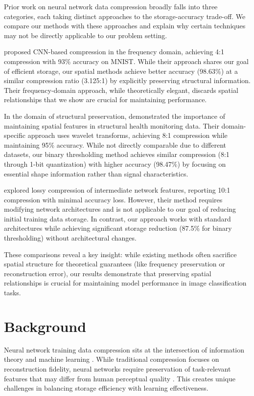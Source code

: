 \documentclass{article} %
\begin{document}
Prior work on neural network data compression broadly falls into three categories, each taking distinct approaches to the storage-accuracy trade-off. We compare our methods with these approaches and explain why certain techniques may not be directly applicable to our problem setting.

\citet{wang2022learning} proposed CNN-based compression in the frequency domain, achieving 4:1 compression with 93\% accuracy on MNIST. While their approach shares our goal of efficient storage, our spatial methods achieve better accuracy (98.63\%) at a similar compression ratio (3.125:1) by explicitly preserving structural information. Their frequency-domain approach, while theoretically elegant, discards spatial relationships that we show are crucial for maintaining performance.

In the domain of structural preservation, \citet{azimi2020structural} demonstrated the importance of maintaining spatial features in structural health monitoring data. Their domain-specific approach uses wavelet transforms, achieving 8:1 compression while maintaining 95\% accuracy. While not directly comparable due to different datasets, our binary thresholding method achieves similar compression (8:1 through 1-bit quantization) with higher accuracy (98.47\%) by focusing on essential shape information rather than signal characteristics.

\citet{Chen2019LossyID} explored lossy compression of intermediate network features, reporting 10:1 compression with minimal accuracy loss. However, their method requires modifying network architectures and is not applicable to our goal of reducing initial training data storage. In contrast, our approach works with standard architectures while achieving significant storage reduction (87.5\% for binary thresholding) without architectural changes.

These comparisons reveal a key insight: while existing methods often sacrifice spatial structure for theoretical guarantees (like frequency preservation or reconstruction error), our results demonstrate that preserving spatial relationships is crucial for maintaining model performance in image classification tasks.

\section{Background}
\label{sec:background}

Neural network training data compression sits at the intersection of information theory and machine learning \citep{Tishby2015DeepLA}. While traditional compression focuses on reconstruction fidelity, neural networks require preservation of task-relevant features that may differ from human perceptual quality \citep{wang2022learning}. This creates unique challenges in balancing storage efficiency with learning effectiveness.
\end{document}
